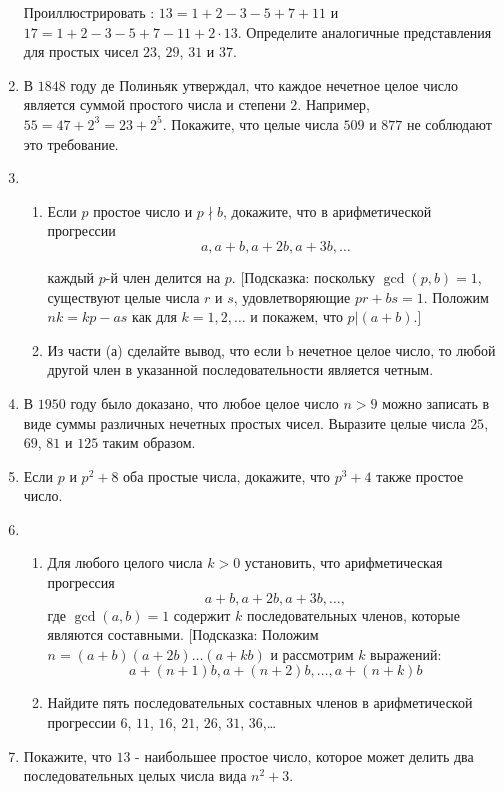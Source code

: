 \documentclass[11pt]{article}
\begin{document}
\begin{enumerate}
Проиллюстрировать :
$13 = 1 + 2 - 3 - 5 + 7 + 11$     и     $17 = 1 + 2 - 3 - 5 + 7 - 11 + 2 \cdot 13$.
Определите аналогичные представления для простых чисел $23$, $29$, $31$ и $37$.

\item	В $1848$ году де Полиньяк утверждал, что каждое нечетное целое число является суммой простого числа и степени $2$. Например, $55 = 47+2^3 = 23+2^5$. Покажите, что целые числа $509$ и $877$ не соблюдают это требование.

\item	
\begin{enumerate}
\item Если $p$ простое число и $p\nmid b$, докажите, что в арифметической прогрессии
\[
a,a+b,a+2b,a+3b,\ldots
\]
 
каждый $p$-й член делится на $p$. [Подсказка: поскольку $\gcd(p, b) = 1$, существуют    целые числа $r$ и $s$, удовлетворяющие $pr + bs = 1$. Положим $nk= kp - as$ как для $k = 1, 2, \ldots$ и покажем, что $p| (a+b)$.]

\item Из части (а) сделайте вывод, что если b нечетное целое число, то любой другой член в указанной последовательности является четным.
\end{enumerate}

\item В $1950$ году было доказано, что любое целое число $n > 9$ можно записать в виде суммы различных нечетных простых чисел. Выразите целые числа $25$, $69$, $81$ и $125$ таким образом.

\item Если $p$ и $p^2 + 8$ оба простые числа, докажите, что $p^3 + 4$ также простое число.

\item
\begin{enumerate}
\item Для любого целого числа $k> 0$ установить, что арифметическая прогрессия
\[
a+b,a+2b,a+3b,\ldots,
\]
где $\gcd(a, b) = 1$ содержит $k$ последовательных членов, которые являются составными. [Подсказка: Положим $n = (a+b)(a+2b) \ldots (a+kb)$ и рассмотрим $k$ выражений:
\[
a+(n+1)b,a+(n+2)b,\ldots,a+(n+k)b
\]
\item Найдите пять последовательных составных членов в арифметической прогрессии
$6$, $11$, $16$, $21$, $26$, $31$, $36$,\ldots 
\end{enumerate}

\item Покажите, что $13$ - наибольшее простое число, которое может делить два последовательных целых числа вида $n^2 + 3$.


\end{enumerate}
\end{document}
